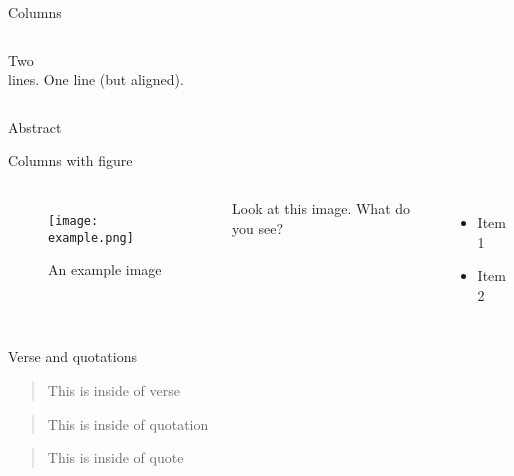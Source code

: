 \begin{frame}{Columns}
  \begin{columns}
    \column[t]{5cm}
      Two\\lines.
    \column[t]{5cm}
      One line (but aligned).
  \end{columns}
\end{frame}


\begin{frame}{Abstract}
  \begin{abstract}
    This is the abstract
  \end{abstract}
\end{frame}

\begin{frame}{Columns with figure}
  \begin{columns}
      \begin{figure}
        \texttt{[image: example.png]}
        \caption[my caption]{An example image}
      \end{figure}
      Look at this image. What do you see?
      \begin{itemize}
       \item Item 1
       \item Item 2
      \end{itemize}
  \end{columns}
\end{frame}


\begin{frame}{Verse and quotations}
  \begin{verse}
    This is inside of verse
  \end{verse}
  \begin{quotation}
    This is inside of quotation
  \end{quotation}
  \begin{quote}
    This is inside of quote
  \end{quote}
\end{frame}



